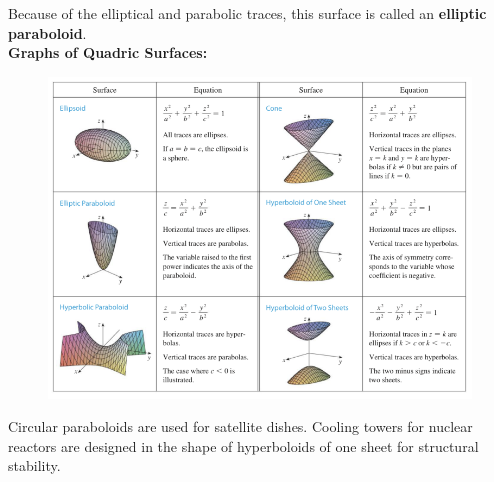         Because of the elliptical and parabolic traces, this surface is called an \textbf{elliptic paraboloid}. \\

        \textbf{Graphs of Quadric Surfaces:}
        \begin{figure}[hbt!]
            \centering
            \includegraphics[]{Resources/12.6_Graphs_Of_Quadric_Surfaces}
        \end{figure}

        Circular paraboloids are used for satellite dishes. Cooling towers for nuclear reactors are designed in the shape of hyperboloids of one sheet for structural stability.


